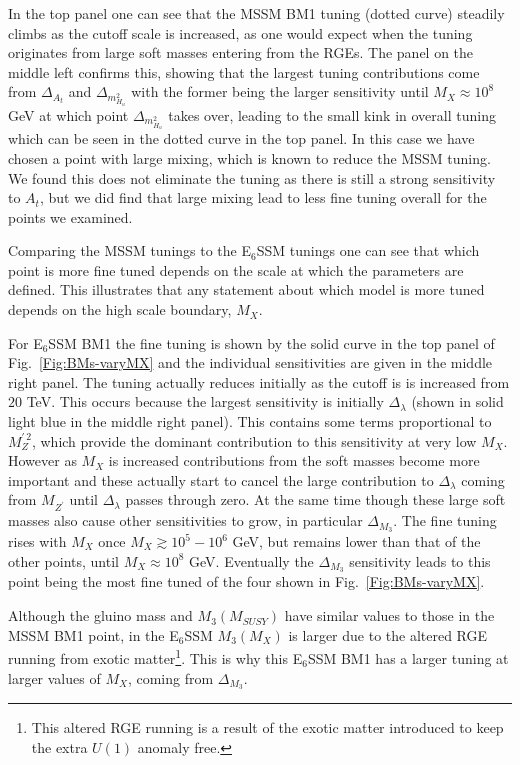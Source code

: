 \documentclass[preprint,amsmath,amssymb,aps,superscriptaddress,prd,
showpacs,floatfix,nofootinbib]{revtex4-1}
\begin{document}
In the top panel one can see that the MSSM BM1 tuning (dotted curve)
steadily climbs as the cutoff scale is increased, as one would expect
when the tuning originates from large soft masses entering from the
RGEs.  The panel on the middle left confirms this, showing that the
largest tuning contributions come from $\Delta_{A_t}$ and
$\Delta_{m_{H_u}^2}$ with the former being the larger sensitivity
until $M_X\approx 10^8$ GeV at which point $\Delta_{m_{H_u}^2}$ takes
over, leading to the small kink in overall tuning which can be seen in
the dotted curve in the top panel.  In this case we have chosen a
point with large mixing, which is known to reduce the MSSM tuning.  We
found this does not eliminate the tuning as there is still a strong
sensitivity to $A_t$, but we did find that large mixing lead to less
fine tuning overall for the points we examined.

Comparing the MSSM tunings to the E$_6$SSM tunings one can see that
which point is more fine tuned depends on the scale at which the
parameters are defined.  This illustrates that any statement about
which model is more tuned depends on the high scale boundary, $M_X$.

For E$_6$SSM BM1 the fine tuning is shown by the solid curve in the top
panel of Fig.~\ref{Fig:BMs-varyMX} and the individual sensitivities
are given in the middle right panel.  The tuning actually reduces
initially as the cutoff is is increased from $20$ TeV.  This occurs
because the largest sensitivity is initially $\Delta_\lambda$ (shown
in solid light blue in the middle right panel).  This contains some terms
proportional to $M_Z^{\prime \, 2}$, which provide the dominant
contribution to this sensitivity at very low $M_X$.  However as $M_X$
is increased contributions from the soft masses become more important
and these actually start to cancel the large contribution to
$\Delta_\lambda$ coming from $M_{Z^\prime}$ until $\Delta_\lambda$
passes through zero.  At the same time though these large soft masses
also cause other sensitivities to grow, in particular $\Delta_{M_3}$.
The fine tuning rises with $M_X$ once $M_X \gtrsim 10^5 - 10^6$ GeV, but
remains lower than that of the other points, until $M_X \approx 10^8$
GeV.  Eventually the $\Delta_{M_3}$ sensitivity leads to this point
being the most fine tuned of the four shown in
Fig.~\ref{Fig:BMs-varyMX}.

Although the gluino mass and $M_3(M_{SUSY})$ have similar values to
those in the MSSM BM1 point, in the E$_6$SSM $M_3(M_X)$ is larger due
to the altered RGE running from exotic matter\footnote{This altered
RGE running is a result of the exotic matter introduced to keep the
extra $U(1)$ anomaly free.}.  This is why this E$_6$SSM BM1 has a
larger tuning at larger values of $M_X$, coming from
$\Delta_{M_3}$.
\end{document}
